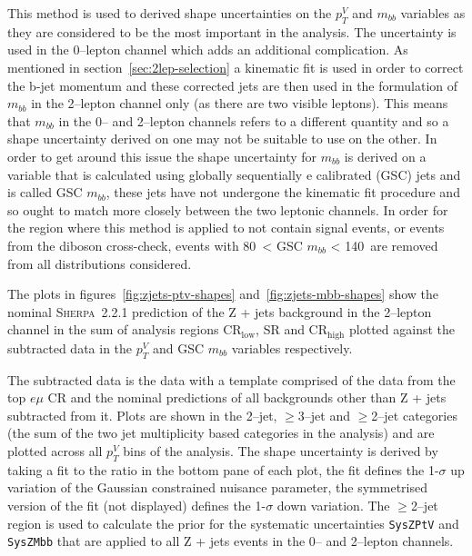 This method is used to derived shape uncertainties on the $p_T^V$ and $m_{bb}$
variables as they are considered to be the most important in the analysis. The
uncertainty is used in the 0--lepton channel which adds an additional
complication. As mentioned in section~\ref{sec:2lep-selection} a kinematic fit
is used in order to correct the b-jet momentum and these corrected jets are then
used in the formulation of $m_{bb}$ in the 2--lepton channel only (as there are
two visible leptons). This means that $m_{bb}$ in the 0-- and 2--lepton channels
refers to a different quantity and so a shape uncertainty derived on one may not
be suitable to use on the other. In order to get around this issue the shape
uncertainty for $m_{bb}$ is derived on a variable that is calculated using
globally sequentially e
calibrated (GSC) jets and is called GSC $m_{bb}$, these jets have not undergone
the kinematic fit procedure and so ought to match more closely between the two
leptonic channels. In order for the region where this method is applied to not
contain signal events, or events from the diboson cross-check, events with
80~\GeV < GSC $m_{bb}$ < 140~\GeV are removed from all distributions considered.

The plots in figures~\ref{fig:zjets-ptv-shapes} and~\ref{fig:zjets-mbb-shapes}
show the nominal \textsc{Sherpa}~2.2.1 prediction of the Z + jets background in
the 2--lepton channel in the sum of analysis regions CR$_{\text{low}}$, SR and
CR$_{\text{high}}$ plotted against the subtracted data in the $p_T^V$ and GSC
$m_{bb}$ variables respectively.


The subtracted data is the data with a template comprised of the data from the
top $e\mu$ CR and the nominal predictions of all backgrounds other than Z + jets
subtracted from it. Plots are shown in the 2--jet, $\geq$3--jet and $\geq$2--jet
categories (the sum of the two jet multiplicity based categories in the
analysis) and are plotted across all $p_T^V$ bins of the analysis. The shape
uncertainty is derived by taking a fit to the ratio in the bottom pane of each
plot, the fit defines the 1-$\sigma$ up variation of the Gaussian constrained
nuisance parameter, the symmetrised version of the fit (not displayed) defines
the 1-$\sigma$ down variation. The $\geq$2--jet region is used to calculate the
prior for the systematic uncertainties \texttt{SysZPtV} and \texttt{SysZMbb}
that are applied to all Z + jets events in the 0-- and 2--lepton channels.

